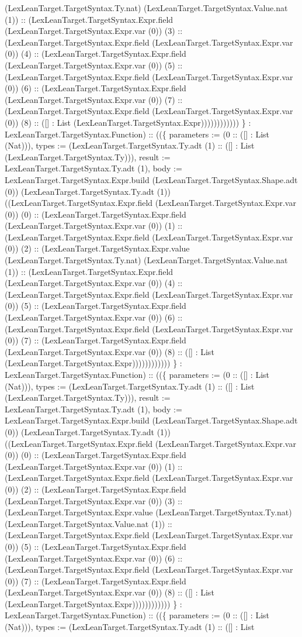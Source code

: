 \documentclass[11pt]{article}
\begin{document}
(LexLeanTarget.TargetSyntax.Ty.nat) (LexLeanTarget.TargetSyntax.Value.nat (1)) :: (LexLeanTarget.TargetSyntax.Expr.field (LexLeanTarget.TargetSyntax.Expr.var (0)) (3) :: (LexLeanTarget.TargetSyntax.Expr.field (LexLeanTarget.TargetSyntax.Expr.var (0)) (4) :: (LexLeanTarget.TargetSyntax.Expr.field (LexLeanTarget.TargetSyntax.Expr.var (0)) (5) :: (LexLeanTarget.TargetSyntax.Expr.field (LexLeanTarget.TargetSyntax.Expr.var (0)) (6) :: (LexLeanTarget.TargetSyntax.Expr.field (LexLeanTarget.TargetSyntax.Expr.var (0)) (7) :: (LexLeanTarget.TargetSyntax.Expr.field (LexLeanTarget.TargetSyntax.Expr.var (0)) (8) :: ([] : List (LexLeanTarget.TargetSyntax.Expr)))))))))))) \} : LexLeanTarget.TargetSyntax.Function) :: ((\{ parameters := (0 :: ([] : List (Nat))), types := (LexLeanTarget.TargetSyntax.Ty.adt (1) :: ([] : List (LexLeanTarget.TargetSyntax.Ty))), result := LexLeanTarget.TargetSyntax.Ty.adt (1), body := LexLeanTarget.TargetSyntax.Expr.build (LexLeanTarget.TargetSyntax.Shape.adt (0)) (LexLeanTarget.TargetSyntax.Ty.adt (1)) ((LexLeanTarget.TargetSyntax.Expr.field (LexLeanTarget.TargetSyntax.Expr.var (0)) (0) :: (LexLeanTarget.TargetSyntax.Expr.field (LexLeanTarget.TargetSyntax.Expr.var (0)) (1) :: (LexLeanTarget.TargetSyntax.Expr.field (LexLeanTarget.TargetSyntax.Expr.var (0)) (2) :: (LexLeanTarget.TargetSyntax.Expr.value (LexLeanTarget.TargetSyntax.Ty.nat) (LexLeanTarget.TargetSyntax.Value.nat (1)) :: (LexLeanTarget.TargetSyntax.Expr.field (LexLeanTarget.TargetSyntax.Expr.var (0)) (4) :: (LexLeanTarget.TargetSyntax.Expr.field (LexLeanTarget.TargetSyntax.Expr.var (0)) (5) :: (LexLeanTarget.TargetSyntax.Expr.field (LexLeanTarget.TargetSyntax.Expr.var (0)) (6) :: (LexLeanTarget.TargetSyntax.Expr.field (LexLeanTarget.TargetSyntax.Expr.var (0)) (7) :: (LexLeanTarget.TargetSyntax.Expr.field (LexLeanTarget.TargetSyntax.Expr.var (0)) (8) :: ([] : List (LexLeanTarget.TargetSyntax.Expr)))))))))))) \} : LexLeanTarget.TargetSyntax.Function) :: ((\{ parameters := (0 :: ([] : List (Nat))), types := (LexLeanTarget.TargetSyntax.Ty.adt (1) :: ([] : List (LexLeanTarget.TargetSyntax.Ty))), result := LexLeanTarget.TargetSyntax.Ty.adt (1), body := LexLeanTarget.TargetSyntax.Expr.build (LexLeanTarget.TargetSyntax.Shape.adt (0)) (LexLeanTarget.TargetSyntax.Ty.adt (1)) ((LexLeanTarget.TargetSyntax.Expr.field (LexLeanTarget.TargetSyntax.Expr.var (0)) (0) :: (LexLeanTarget.TargetSyntax.Expr.field (LexLeanTarget.TargetSyntax.Expr.var (0)) (1) :: (LexLeanTarget.TargetSyntax.Expr.field (LexLeanTarget.TargetSyntax.Expr.var (0)) (2) :: (LexLeanTarget.TargetSyntax.Expr.field (LexLeanTarget.TargetSyntax.Expr.var (0)) (3) :: (LexLeanTarget.TargetSyntax.Expr.value (LexLeanTarget.TargetSyntax.Ty.nat) (LexLeanTarget.TargetSyntax.Value.nat (1)) :: (LexLeanTarget.TargetSyntax.Expr.field (LexLeanTarget.TargetSyntax.Expr.var (0)) (5) :: (LexLeanTarget.TargetSyntax.Expr.field (LexLeanTarget.TargetSyntax.Expr.var (0)) (6) :: (LexLeanTarget.TargetSyntax.Expr.field (LexLeanTarget.TargetSyntax.Expr.var (0)) (7) :: (LexLeanTarget.TargetSyntax.Expr.field (LexLeanTarget.TargetSyntax.Expr.var (0)) (8) :: ([] : List (LexLeanTarget.TargetSyntax.Expr)))))))))))) \} : LexLeanTarget.TargetSyntax.Function) :: ((\{ parameters := (0 :: ([] : List (Nat))), types := (LexLeanTarget.TargetSyntax.Ty.adt (1) :: ([] : List 
\end{document}
